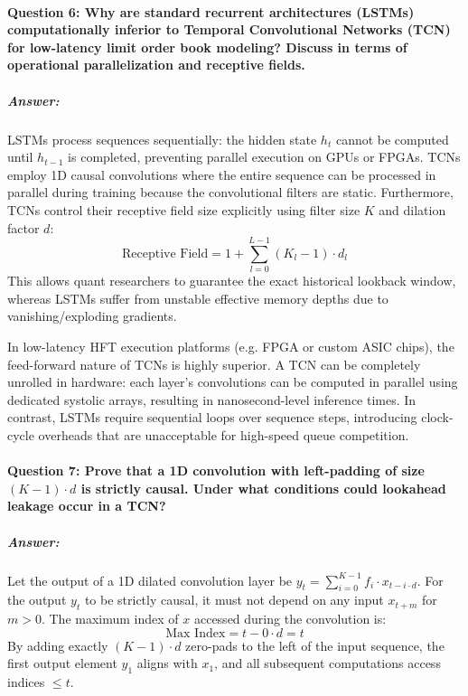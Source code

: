 \documentclass[11pt,a4paper]{article}
\begin{document}
\paragraph{Question 6: Why are standard recurrent architectures (LSTMs) computationally inferior to Temporal Convolutional Networks (TCN) for low-latency limit order book modeling? Discuss in terms of operational parallelization and receptive fields.}
\subparagraph{Answer:}
LSTMs process sequences sequentially: the hidden state $h_t$ cannot be computed until $h_{t-1}$ is completed, preventing parallel execution on GPUs or FPGAs. TCNs employ 1D causal convolutions where the entire sequence can be processed in parallel during training because the convolutional filters are static. Furthermore, TCNs control their receptive field size explicitly using filter size $K$ and dilation factor $d$:
\begin{equation}
    \text{Receptive Field} = 1 + \sum_{l=0}^{L-1} (K_l - 1) \cdot d_l
\end{equation}
This allows quant researchers to guarantee the exact historical lookback window, whereas LSTMs suffer from unstable effective memory depths due to vanishing/exploding gradients.

In low-latency HFT execution platforms (e.g. FPGA or custom ASIC chips), the feed-forward nature of TCNs is highly superior. A TCN can be completely unrolled in hardware: each layer's convolutions can be computed in parallel using dedicated systolic arrays, resulting in nanosecond-level inference times. In contrast, LSTMs require sequential loops over sequence steps, introducing clock-cycle overheads that are unacceptable for high-speed queue competition.

\paragraph{Question 7: Prove that a 1D convolution with left-padding of size $(K-1) \cdot d$ is strictly causal. Under what conditions could lookahead leakage occur in a TCN?}
\subparagraph{Answer:}
Let the output of a 1D dilated convolution layer be $y_t = \sum_{i=0}^{K-1} f_i \cdot x_{t - i \cdot d}$. For the output $y_t$ to be strictly causal, it must not depend on any input $x_{t+m}$ for $m > 0$.
The maximum index of $x$ accessed during the convolution is:
\begin{equation}
    \text{Max Index} = t - 0 \cdot d = t
\end{equation}
By adding exactly $(K-1) \cdot d$ zero-pads to the left of the input sequence, the first output element $y_1$ aligns with $x_1$, and all subsequent computations access indices $\leq t$.
\end{document}
